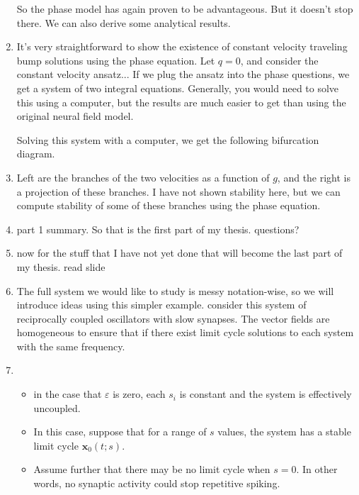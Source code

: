 \documentclass[a4paper,14pt]{article}
\newcommand{\x}{\mathbf{x}}
\newcommand{\ve}{\varepsilon}
\begin{document}
\begin{enumerate}
So the phase model has again proven to be advantageous. But it doesn't stop there. We can also derive some analytical results.

\item It's very straightforward to show the existence of constant velocity traveling bump solutions using the phase equation. Let $q=0$, and consider the constant velocity ansatz... If we plug the ansatz into the phase questions, we get a system of two integral equations. Generally, you would need to solve this using a computer, but the results are much easier to get than using the original neural field model.

Solving this system with a computer, we get the following bifurcation diagram.

\item Left are the branches of the two velocities as a function of $g$, and the right is a projection of these branches. I have not shown stability here, but we can compute stability of some of these branches using the phase equation.

\item part 1 summary. So that is the first part of my thesis. questions?


\item now for the stuff that I have not yet done that will become the last part of my thesis. read slide

\item The full system we would like to study is messy notation-wise, so we will introduce ideas using this simpler example. consider this system of reciprocally coupled oscillators with slow synapses. The vector fields are homogeneous to ensure that if there exist limit cycle solutions to each system with the same frequency.

\item 
\begin{itemize}
 \item in the case that $\ve$ is zero, each $s_i$ is constant and the system is effectively uncoupled.
 \item In this case, suppose that for a range of $s$ values, the system has a stable limit cycle $\x_0(t;s)$.
 \item Assume further that there may be no limit cycle when $s=0$. In other words, no synaptic activity could stop repetitive spiking.
\end{itemize}



\end{enumerate}
\end{document}
